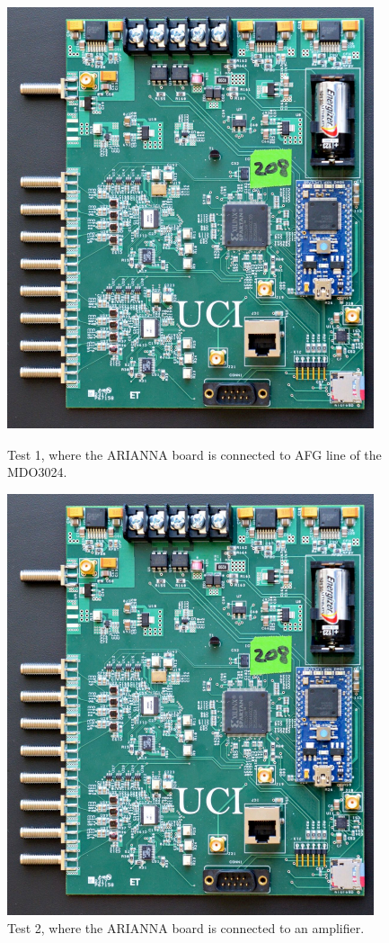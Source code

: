 \documentclass[journal]{IEEEtran}
\begin{document}
\begin{figure}
	\centering
	\includegraphics[scale=0.08]{mboard.png}
	\caption{Test 1, where the ARIANNA board is connected to AFG line of the MDO3024.}
	\includegraphics[scale=0.08]{mboard.png}
	\caption{Test 2, where the ARIANNA board is connected to an amplifier.}

\end{figure}
\end{document}
